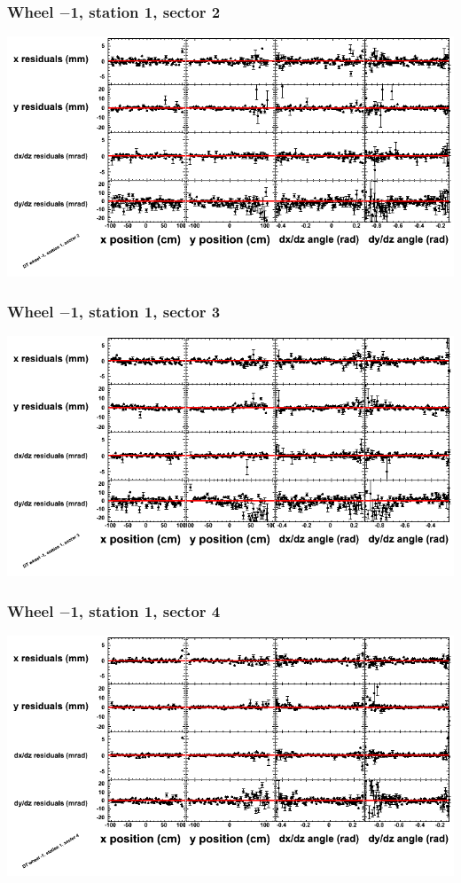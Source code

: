 \documentclass[compress]{beamer}
\begin{document}
\begin{frame}
\frametitle{Wheel $-$1, station 1, sector 2}
\includegraphics[width=\linewidth]{tmppoly_MBwhBst1sec02.png}
\end{frame}

\begin{frame}
\frametitle{Wheel $-$1, station 1, sector 3}
\includegraphics[width=\linewidth]{tmppoly_MBwhBst1sec03.png}
\end{frame}

\begin{frame}
\frametitle{Wheel $-$1, station 1, sector 4}
\includegraphics[width=\linewidth]{tmppoly_MBwhBst1sec04.png}
\end{frame}
\end{document}

